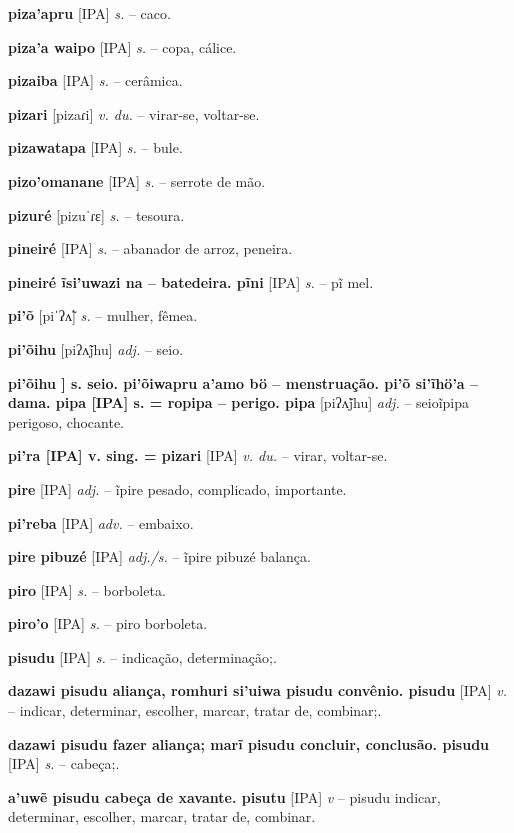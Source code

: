\textbf{piza'apru} [IPA] \textit{s.} -- caco.

\textbf{piza'a waipo} [IPA] \textit{s.} -- copa, cálice.

\textbf{pizaiba} [IPA] \textit{s.} -- cerâmica.

\textbf{pizari} [pizaɾi] \textit{v. du.} -- virar-se, voltar-se.

\textbf{pizawatapa} [IPA] \textit{s.} -- bule.

\textbf{pizo'omanane} [IPA] \textit{s.} -- serrote de mão.

\textbf{pizuré} [pizuˈɾɛ] \textit{s.} -- tesoura.

\textbf{pineiré} [IPA] \textit{s.} -- abanador de arroz, peneira.

\textbf{pineiré ĩsi'uwazi na -- batedeira. pĩni} [IPA] \textit{s.} -- pĩ mel.

\textbf{pi'õ} [piˈʔʌ̃] \textit{s.} -- mulher, fêmea.

\textbf{pi'õihu} [piʔʌ̃jhu] \textit{adj.} -- seio. \href{https://xavante.pythonanywhere.com/static/dicionario/play.html?file=breast.wav}{\faHeadphones}

\textbf{pi'õihu ] s. seio. pi'õiwapru a'amo bö -- menstruação. pi'õ si'ĩhö'a -- dama. pipa [IPA] s. = ropipa -- perigo. pipa} [piʔʌ̃jhu] \textit{adj.} -- seioĩpipa perigoso, chocante.

\textbf{pi'ra [IPA] v. sing. = pizari} [IPA] \textit{v. du.} -- virar, voltar-se.

\textbf{pire} [IPA] \textit{adj.} -- ĩpire pesado, complicado, importante.

\textbf{pi'reba} [IPA] \textit{adv.} -- embaixo.

\textbf{pire pibuzé} [IPA] \textit{adj./s.} -- ĩpire pibuzé balança.

\textbf{piro} [IPA] \textit{s.} -- borboleta.

\textbf{piro'o} [IPA] \textit{s.} -- piro borboleta.

\textbf{pisudu} [IPA] \textit{s.} -- indicação, determinação;.

\textbf{dazawi pisudu aliança, romhuri si'uiwa pisudu convênio. pisudu} [IPA] \textit{v.} -- indicar, determinar, escolher, marcar, tratar de, combinar;.

\textbf{dazawi pisudu fazer aliança; marĩ pisudu concluir, conclusão. pisudu} [IPA] \textit{s.} -- cabeça;.

\textbf{a'uwẽ pisudu cabeça de xavante. pisutu} [IPA] \textit{v} -- pisudu indicar, determinar, escolher, marcar, tratar de, combinar.

